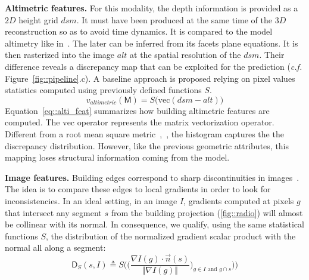 \documentclass[runningheads]{llncs}
\begin{document}
\noindent
\textbf{Altimetric features.}
For this modality, the depth information is provided as a $2D$ height grid $dsm$. It must have been produced at the same time of the $3D$ reconstruction so as to avoid time dynamics. It is compared to the model altimetry like in~\cite{Bredif2007}. The later can be inferred from its facets plane equations. It is then rasterized into the image $alt$ at the spatial resolution of the $dsm$. Their difference reveals a discrepancy map that can be exploited for the prediction (\textit{c.f.} Figure~\ref{fig::pipeline}.c). A baseline approach is proposed relying on pixel values statistics computed using previously defined functions $S$.
\begin{equation}
	\label{eq::alti_feat}
    v_{altimetric}(\mathsf{M}) = S\big( \mathrm{vec}(dsm - alt) \big)
\end{equation}
Equation~\ref{eq::alti_feat} summarizes how building altimetric features are computed. The $\mathrm{vec}$ operator represents the matrix vectorization operator. Different from a root mean square metric~\cite{lafarge2012creating},~\cite{Poullis2013}, the histogram captures the the discrepancy distribution. However, like the previous geometric attributes, this mapping loses structural information coming from the model.

\noindent
\textbf{Image features.}
Building edges correspond to sharp discontinuities in images~\cite{canny1986computational}. The idea is to compare these edges to local gradients in order to look for inconsistencies. In an ideal setting, in an image $I$, gradients computed at pixels $g$ that intersect any segment $s$ from the building projection (\ref{fig::radio}) will almost be collinear with its normal. In consequence, we qualify, using the same statistical functions $S$, the distribution of the normalized gradient scalar product with the normal all along a segment:
\begin{equation}
	\label{eq::corr_seg}
    \mathsf{D}_S(s, I) \triangleq S \bigg( \Big(\frac{\nabla I(g) \cdot \vec{n}(s)}{\Vert \nabla I(g)\Vert})_{g \in I \textrm{ and } g \cap s} \Big)\bigg)
\end{equation}
\end{document}
